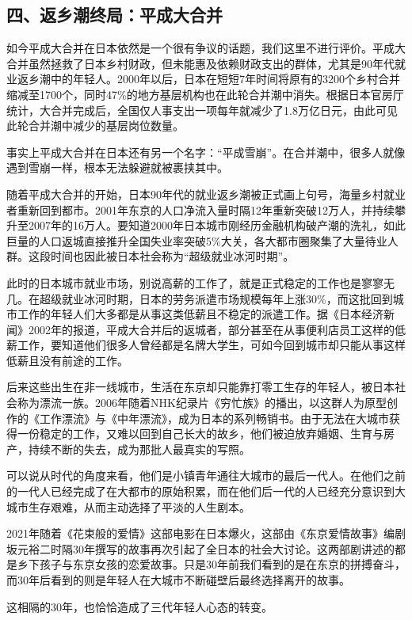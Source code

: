 \subsection{四、返乡潮终局：平成大合并}

如今平成大合并在日本依然是一个很有争议的话题，我们这里不进行评价。平成大合并虽然拯救了日本乡村财政，但未能惠及依赖财政支出的群体，尤其是90年代就业返乡潮中的年轻人。2000年以后，日本在短短7年时间将原有的3200个乡村合并缩减至1700个，同时47\%的地方基层机构也在此轮合并潮中消失。根据日本官房厅统计，大合并完成后，全国仅人事支出一项每年就减少了1.8万亿日元，由此可见此轮合并潮中减少的基层岗位数量。

事实上平成大合并在日本还有另一个名字：“平成雪崩”。在合并潮中，很多人就像遇到雪崩一样，根本无法躲避就被裹挟其中。

随着平成大合并的开始，日本90年代的就业返乡潮被正式画上句号，海量乡村就业者重新回到都市。2001年东京的人口净流入量时隔12年重新突破12万人，并持续攀升至2007年的16万人。要知道2000年日本城市刚经历金融机构破产潮的洗礼，如此巨量的人口返城直接推升全国失业率突破5\%大关，各大都市圈聚集了大量待业人群。这段时间也因此被日本社会称为“超级就业冰河时期”。

此时的日本城市就业市场，别说高薪的工作了，就是正式稳定的工作也是寥寥无几。在超级就业冰河时期，日本的劳务派遣市场规模每年上涨30\%，而这批回到城市工作的年轻人们大多都是从事这类低薪且不稳定的派遣工作。据《日本经济新闻》2002年的报道，平成大合并后的返城者，部分甚至在从事便利店员工这样的低薪工作，要知道他们很多人曾经都是名牌大学生，可如今回到城市却只能从事这样低薪且没有前途的工作。

后来这些出生在非一线城市，生活在东京却只能靠打零工生存的年轻人，被日本社会称为漂流一族。2006年随着NHK纪录片《穷忙族》的播出，以这群人为原型创作的《工作漂流》与《中年漂流》，成为日本的系列畅销书。由于无法在大城市获得一份稳定的工作，又难以回到自己长大的故乡，他们被迫放弃婚姻、生育与房产，持续不断的失去，成为那批人最真实的写照。

可以说从时代的角度来看，他们是小镇青年通往大城市的最后一代人。在他们之前的一代人已经完成了在大都市的原始积累，而在他们后一代的人已经充分意识到大城市生存艰难，从而主动选择了平淡的人生剧本。

2021年随着《花束般的爱情》这部电影在日本爆火，这部由《东京爱情故事》编剧坂元裕二时隔30年撰写的故事再次引起了全日本的社会大讨论。这两部剧讲述的都是乡下孩子与东京女孩的恋爱故事。只是30年前我们看到的是在东京的拼搏奋斗，而30年后看到的则是年轻人在大城市不断碰壁后最终选择离开的故事。

这相隔的30年，也恰恰造成了三代年轻人心态的转变。

